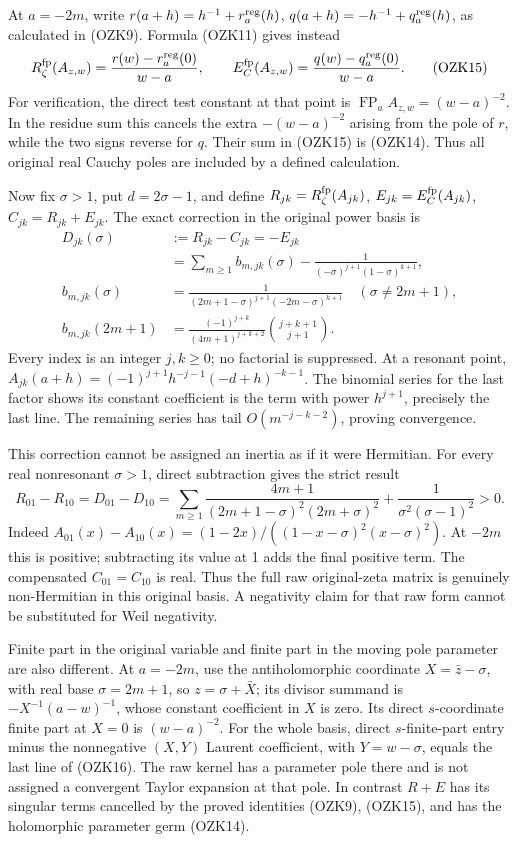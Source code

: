 \documentclass[
  10pt,
  a4paper,
]{article}
\begin{document}
At \(a=-2m\), write \(r(a+h)=h^{-1}+r_a^{\rm reg}(h)\),
\(q(a+h)=-h^{-1}+q_a^{\rm reg}(h)\), as calculated in (OZK9). Formula
(OZK11) gives instead \[
R_\zeta^{\rm fp}(A_{z,w})
=\frac{r(w)-r_a^{\rm reg}(0)}{w-a},\qquad
E_C^{\rm fp}(A_{z,w})
=\frac{q(w)-q_a^{\rm reg}(0)}{w-a}.
\tag{OZK15}
\] For verification, the direct test constant at that point is
\(\operatorname{FP}_a A_{z,w}=(w-a)^{-2}\). In the residue sum this
cancels the extra \(-(w-a)^{-2}\) arising from the pole of \(r\), while
the two signs reverse for \(q\). Their sum in (OZK15) is (OZK14). Thus
all original real Cauchy poles are included by a defined calculation.

Now fix \(\sigma>1\), put \(d=2\sigma-1\), and define
\(R_{jk}=R_\zeta^{\rm fp}(A_{jk})\), \(E_{jk}=E_C^{\rm fp}(A_{jk})\),
\(C_{jk}=R_{jk}+E_{jk}\). The exact correction in the original power
basis is \[
\begin{aligned}
D_{jk}(\sigma)&:=R_{jk}-C_{jk}=-E_{jk}\\
&=\sum_{m\ge1} b_{m,jk}(\sigma)
 -\frac1{(-\sigma)^{j+1}(1-\sigma)^{k+1}},\\
b_{m,jk}(\sigma)&=
\frac1{(2m+1-\sigma)^{j+1}(-2m-\sigma)^{k+1}}
\quad (\sigma\ne2m+1),\\
b_{m,jk}(2m+1)&=
\frac{(-1)^{j+k}}{(4m+1)^{j+k+2}}
\binom{j+k+1}{j+1}.
\end{aligned}\tag{OZK16}
\] Every index is an integer \(j,k\ge0\); no factorial is suppressed. At
a resonant point, \(A_{jk}(a+h)=(-1)^{j+1}h^{-j-1}(-d+h)^{-k-1}\). The
binomial series for the last factor shows its constant coefficient is
the term with power \(h^{j+1}\), precisely the last line. The remaining
series has tail \(O(m^{-j-k-2})\), proving convergence.

This correction cannot be assigned an inertia as if it were Hermitian.
For every real nonresonant \(\sigma>1\), direct subtraction gives the
strict result \[
R_{01}-R_{10}=D_{01}-D_{10}
=\sum_{m\ge1}\frac{4m+1}
 {(2m+1-\sigma)^2(2m+\sigma)^2}
+\frac1{\sigma^2(\sigma-1)^2}>0.
\tag{OZK17}
\] Indeed \(A_{01}(x)-A_{10}(x)=(1-2x)/((1-x-\sigma)^2(x-\sigma)^2)\).
At \(-2m\) this is positive; subtracting its value at 1 adds the final
positive term. The compensated \(C_{01}=C_{10}\) is real. Thus the full
raw original-zeta matrix is genuinely non-Hermitian in this original
basis. A negativity claim for that raw form cannot be substituted for
Weil negativity.

Finite part in the original variable and finite part in the moving pole
parameter are also different. At \(a=-2m\), use the antiholomorphic
coordinate \(X=\bar z-\sigma\), with real base \(\sigma=2m+1\), so
\(z=\sigma+\bar X\); its divisor summand is \(-X^{-1}(a-w)^{-1}\), whose
constant coefficient in \(X\) is zero. Its direct \(s\)-coordinate
finite part at \(X=0\) is \((w-a)^{-2}\). For the whole basis, direct
\(s\)-finite-part entry minus the nonnegative \((X,Y)\) Laurent
coefficient, with \(Y=w-\sigma\), equals the last line of (OZK16). The
raw kernel has a parameter pole there and is not assigned a convergent
Taylor expansion at that pole. In contrast \(R+E\) has its singular
terms cancelled by the proved identities (OZK9), (OZK15), and has the
holomorphic parameter germ (OZK14).
\end{document}
